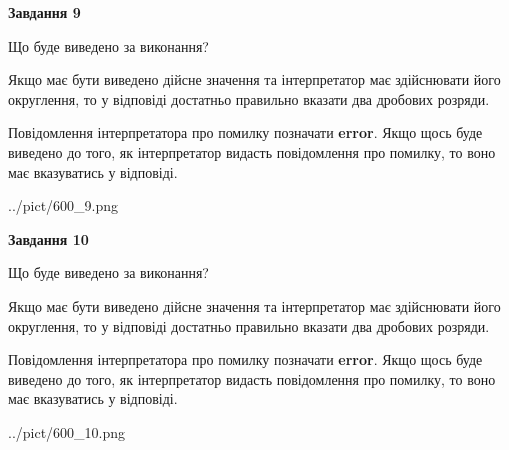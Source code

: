 \documentclass[12pt, ukrainian]{article}
\begin{document}
{\begin {Large}
{\begin {center}\textbf{Завдання 9}\end {center}}\par
Що буде виведено за виконання? \par

Якщо має бути виведено дійсне значення та інтерпретатор має здійснювати його округлення, 
то у відповіді достатньо правильно вказати два дробових розряди.

Повідомлення інтерпретатора про помилку позначати \textbf{error}.
Якщо щось буде виведено до того, як інтерпретатор видасть повідомлення про помилку, 
то воно має вказуватись у відповіді. \par

\begin{center}
	{../pict/600_9.png}
\end{center}
\newpage

{\begin {center}\textbf{Завдання 10}\end {center}}\par
Що буде виведено за виконання? \par

Якщо має бути виведено дійсне значення та інтерпретатор має здійснювати його округлення, 
то у відповіді достатньо правильно вказати два дробових розряди.

Повідомлення інтерпретатора про помилку позначати \textbf{error}.
Якщо щось буде виведено до того, як інтерпретатор видасть повідомлення про помилку, 
то воно має вказуватись у відповіді. \par

\begin{center}
	{../pict/600_10.png}
\end{center}
\newpage

\end {Large}}
\end{document}
